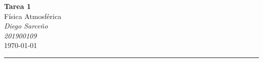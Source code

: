 



%
%
%






\textcolor{DS_Black}{
\begin{minipage}{0.85\textwidth}
    \begin{center}
        \textbf{\Large Tarea 1}\\
        \vspace{5pt}
        Física Atmosférica \\
        \vspace{20pt}
        \textit{Diego Sarceño} \\
        \vspace{5pt}
        \footnotesize{\textit{201900109}} \\
        \vspace{5pt}
        \today
    \end{center}
\end{minipage}
\vspace{10pt}
\hrule
}